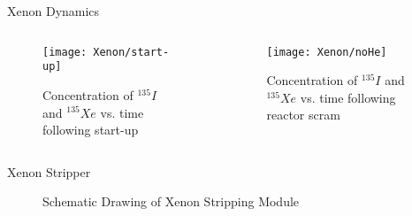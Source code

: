 \documentclass[aspectratio=169,pdftex,dvipsnames]{beamer}
\newcommand{\I}[1][135]{$^{#1}I$ }
\newcommand{\Xe}[1][135]{$^{#1}Xe$ }
\begin{document}
\begin{frame}{Xenon Dynamics}
    \begin{columns}
        \begin{column}{0.5\textwidth}
            \begin{figure}[ht!]
                \centering
                \texttt{[image: Xenon/start-up]}
                \caption{Concentration of \I and \Xe vs. time following start-up}
            \end{figure}
        \end{column}
        \begin{column}{0.5\textwidth}
            \begin{figure}[ht!]
                \centering
                \texttt{[image: Xenon/noHe]}
                \caption{Concentration of \I and \Xe vs. time following reactor scram}
            \end{figure}
        \end{column}
    \end{columns}
\end{frame}

\begin{frame}{Xenon Stripper}
    \begin{figure}[ht!]\centering
        \resizebox*{0.95\textwidth}{!}{}
         \caption{Schematic Drawing of Xenon Stripping Module}
    \end{figure}
\end{frame}
\end{document}
